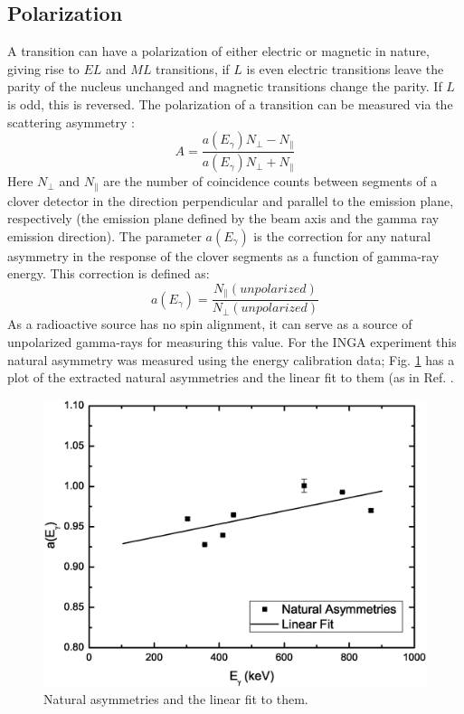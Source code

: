 \subsection{Polarization}
\label{ssec:exp-pol}
A transition can have a polarization of either electric or magnetic in nature, giving rise to $EL$ and $ML$ transitions, if $L$ is even electric transitions leave the parity of the nucleus unchanged and magnetic transitions change the parity. If $L$ is odd, this is reversed. The polarization of a transition can be measured via the scattering asymmetry \cite{expPolDCO}:
\begin{equation}
\label{eqn:chp3-scat-asym}
A=\frac{a(E_{\gamma})N_{\perp}-N_{\parallel}}{a(E_{\gamma})N_{\perp}+N_{\parallel}}
\end{equation}
Here $N_{\perp}$ and $N_{\parallel}$ are the number of coincidence counts between segments of a clover detector in the direction perpendicular and parallel to the emission plane, respectively (the emission plane defined by the beam axis and the gamma ray emission direction). The parameter $a(E_{\gamma})$ is the correction for any natural asymmetry in the response of the clover segments as a function of gamma-ray energy. This correction is defined as:
\begin{equation}
\label{eqn:chp3-nat-asym-corr}
a(E_{\gamma})=\frac{N_{\parallel}(unpolarized)}{N_{\perp}(unpolarized)}
\end{equation}
As a radioactive source has no spin alignment, it can serve as a source of unpolarized gamma-rays for measuring this value. For the INGA experiment this natural asymmetry was measured using the energy calibration data; Fig. \ref{fig:chp3-nat-asyms} has a plot of the extracted natural asymmetries and the linear fit to them (as in Ref. \cite{expPolDCO}.
\begin{figure}[ht!]
	\centerline{\includegraphics[height=0.35\textheight]{./img/c3/naturalAsymPlot.eps}}
	\caption{Natural asymmetries and the linear fit to them. \label{fig:chp3-nat-asyms}}
\end{figure}
